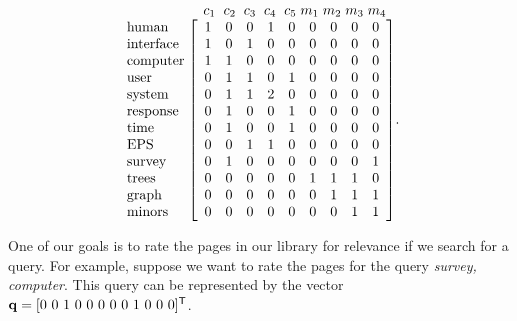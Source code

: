 \begin{equation} \label{eq:LSI_A}
\begin{tabular}{cc}
	&$\arraycolsep=1.4pt \hspace{-4.5mm}  \begin{array}{ccccccccc}c_1&\hspace{1.0mm} c_2&\hspace{1.0mm}c_3&\hspace{1.0mm}c_4&\hspace{1.0mm}c_5&m_1&m_2&m_3&m_4 \end{array}$ \\
$\begin{array}{l} \text{human} \\ \text{interface}  \\ \text{computer} \\ \text{user} \\ \text{system} \\ \text{response}  \\ \text{time} \\ \text{EPS} \\ \text{survey} \\ \text{trees} \\ \text{graph} \\ \text{minors} \end{array}$	&\hspace{-5mm}$\left[ \begin{array}{ccccccccc} 1&0&0&1&0&0&0&0&0 \\ 1&0&1&0&0&0&0&0&0  \\ 1&1&0&0&0&0&0&0&0 \\ 0&1&1&0&1&0&0&0&0  \\ 0&1&1&2&0&0&0&0&0 \\ 0&1&0&0&1&0&0&0&0 \\ 0&1&0&0&1&0&0&0&0 \\ 0&0&1&1&0&0&0&0&0 \\ 0&1&0&0&0&0&0&0&1 \\ 0&0&0&0&0&1&1&1&0 \\ 0&0&0&0&0&0&1&1&1 \\ 0&0&0&0&0&0&0&1&1  \end{array} \right]$.
\end{tabular}
\end{equation}


One of our goals is to rate the pages in our library for relevance if we search for a query. For example, suppose we want to rate the pages for the query \emph{survey, computer}. This query can be represented by the vector $\vq= [0 \ 0 \ 1 \ 0  \ 0 \ 0 \ 0 \ 0 \ 1 \ 0 \ 0 \ 0 ]^{\tr}$.  

